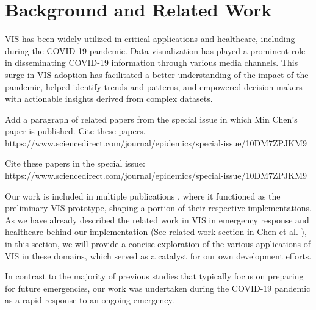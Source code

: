 \section{Background and Related Work}

\ac{VIS} has been widely utilized in critical applications and healthcare, including during the COVID-19 pandemic.
Data visualization has played a prominent role in disseminating COVID-19 information through various media channels.
This surge in \ac{VIS} adoption has facilitated a better understanding of the impact of the pandemic, helped identify trends and patterns, and empowered decision-makers with actionable insights derived from complex datasets.

Add a paragraph of related papers from the special issue in which Min Chen's paper is published.  Cite these papers.
https://www.sciencedirect.com/journal/epidemics/special-issue/10DM7ZPJKM9

Cite these papers in the special issue:
https://www.sciencedirect.com/journal/epidemics/special-issue/10DM7ZPJKM9

Our work is included in multiple publications \cite{chen2022RAMPVIS,dykes2022Visualizationb,khan2022Propagating,rydow2023RAMPVIS},  where it functioned as the preliminary VIS prototype, shaping a portion of their respective implementations.
As we have already described the related work in \ac{VIS} in emergency response and healthcare behind our implementation (See related work section in Chen et al. \cite{chen2022RAMPVIS}), in this section, we will provide a concise exploration of the various applications of \ac{VIS} in these domains, which served as a catalyst for our own development efforts.

In contrast to the majority of previous studies that typically focus on preparing for future emergencies, our work was undertaken during the COVID-19 pandemic as a rapid response to an ongoing emergency.